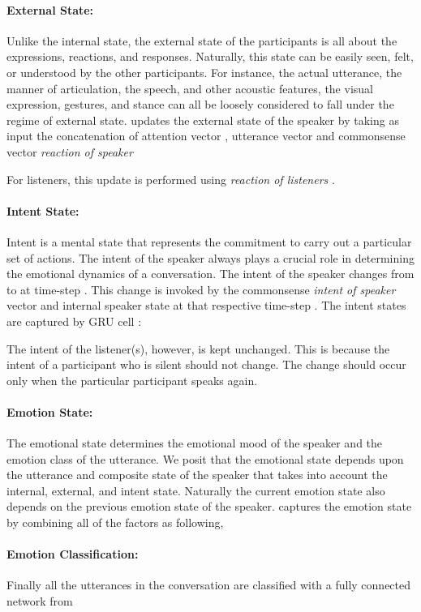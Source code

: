 \documentclass[11pt,a4paper]{article}
\begin{document}
\paragraph{External State:}
Unlike the internal state, the external state of the participants is all about the expressions, reactions, and responses. Naturally, this state can be easily seen, felt, or understood by the other participants. For instance, the actual utterance, the manner of articulation, the speech, and other acoustic features, the visual expression, gestures, and stance can all be loosely considered to fall under the regime of external state.  updates the external state of the speaker  by taking as input the concatenation of attention vector , utterance vector  and commonsense vector \textit{reaction of speaker} 

For listeners, this update is performed using \textit{reaction of listeners} .


\paragraph{Intent State:}
Intent is a mental state that represents the commitment to carry out a particular set of actions. The intent of the speaker always plays a crucial role in determining the emotional dynamics of a conversation. The intent of the speaker changes from  to  at time-step . This change is invoked by the commonsense \textit{intent of speaker} vector  and internal speaker state  at that respective time-step . The intent states are captured by GRU cell :

The intent of the listener(s), however, is kept unchanged. This is because the intent of a participant who is silent should not change. The change should occur only when the particular participant speaks again.


\paragraph{Emotion State:}
The emotional state determines the emotional mood of the speaker and the emotion class of the utterance. We posit that the emotional state depends upon the utterance and composite state of the speaker that takes into account the internal, external, and intent state. Naturally the current emotion state also depends on the previous emotion state of the speaker.  captures the emotion state by combining all of the factors as following,


\paragraph{Emotion Classification:} Finally all the utterances in the conversation are classified with a fully connected network from 
\end{document}
